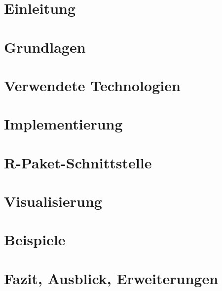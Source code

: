 \chapter{Einleitung}
\label{cha:introduction}


\chapter{Grundlagen}
\label{cha:basics}


\chapter{Verwendete Technologien}
\label{cha:technologies}


\chapter{Implementierung}
\label{cha:implementation}


\chapter{R-Paket-Schnittstelle}
\label{cha:interface}


\chapter{Visualisierung}
\label{cha:visualization}


\chapter{Beispiele}
\label{cha:examples}


\chapter{Fazit, Ausblick, Erweiterungen}
\label{cha:result}

